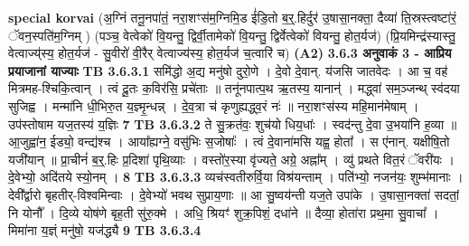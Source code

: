 \documentclass[17pt]{extarticle}
\begin{document}
{{{{{{{{{{{{{{{{{{{                                                        \textbf{special korvai} \newline
              (अ॒ग्निं तनू॒नपा॑तं॒ नरा॒शꣳस॑म॒ग्निमि॒ड ई॑डि॒तो ब॒र्॒.हिर्दुर॑ उ॒षासा॒नक्ता॒ दैव्या॑ ति॒स्रस्त्वष्टा॑रं॒ ॅवन॒स्पति॑म॒ग्निम् ) (पञ्च॒ वेत्वेको॑ वि॒यन्तु॒ द्विर्वी॒तामेको॑ वि॒यन्तु॒ द्विर्वेत्वेको॑ वियन्तु॒ होत॒र्यज॑) \newline
                                (प्रि॒यमिन्द्र॑स्यास्तु॒ वेत्वाज्य्॑स्य॒ होत॒र्यज॑ - सु॒वीरो॑ वी॒रैर् वेत्वाज्य॑स्य॒ होत॒र्यज॑ च॒त्वारि॑ च) \textbf{(A2)} \newline \newline
                \textbf{ 3.6.3     अनुवाकं   3 - आप्रिय प्रयाजानां याज्याः} \newline
                                \textbf{ TB 3.6.3.1} \newline
                  समि॑द्धो अ॒द्य मनु॑षो दुरो॒णे । दे॒वो दे॒वान्. य॑जसि जातवेदः । आ च॒ वह॑ मित्रमह-श्चिकि॒त्वान् । त्वं दू॒तः क॒विर॑सि॒ प्रचे॑ताः ॥ तनू॑नपात्प॒थ ऋ॒तस्य॒ यानान्॑ । मद्ध्वा॑ सम॒ञ्जन्थ् स्व॑दया सुजिह्व । मन्मा॑नि धी॒भिरु॒त य॒ज्ञ्मृ॒न्धन्न् । दे॒व॒त्रा च॑ कृणुह्यद्ध्व॒रं नः॑ ॥ नरा॒शꣳस॑स्य महि॒मान॑मेषाम् । उप॑स्तोषाम यज॒तस्य॑ य॒ज्ञिः \textbf{ 7} \newline
                  \newline
                                \textbf{ TB 3.6.3.2} \newline
                  ते सु॒क्रत॑वः॒ शुच॑यो धिय॒धांः । स्वद॑न्तु दे॒वा उ॒भया॑नि ह॒व्या ॥ आ॒जुह्वा॑न॒ ईड्यो॒ वन्द्य॑श्च । आया᳚ह्यग्ने॒ वसु॑भिः स॒जोषाः᳚ । त्वं दे॒वाना॑मसि यह्व॒ होता᳚ । स ए॑नान्. यक्षीषि॒तो यजी॑यान् ॥ प्रा॒चीनं॑ ब॒र्॒.हिः प्र॒दिशा॑ पृथि॒व्याः । वस्तो॑र॒स्या वृ॑ज्यते॒ अग्रे॒ अह्ना᳚म् । व्यु॑ प्रथते वित॒रं ॅवरी॑यः । दे॒वेभ्यो॒ अदि॑तये स्यो॒नम् । \textbf{ 8} \newline
                  \newline
                                \textbf{ TB 3.6.3.3} \newline
                  व्यच॑स्वतीरुर्वि॒या विश्र॑यन्ताम् । पति॑भ्यो॒ नजन॑यः॒ शुम्भ॑मानाः । देवी᳚र्द्वारो बृहतीर्-विश्वमिन्वाः । दे॒वेभ्यो॑ भवथ सुप्राय॒णाः ॥ आ सु॒ष्वय॑न्ती यज॒ते उपा॑के । उ॒षासा॒नक्ता॑ सदतां॒ नि योनौ᳚ । दि॒व्ये योष॑णे बृह॒ती सु॑रु॒क्मे । अधि॒ श्रियꣳ॑ शुक्र॒पिशं॒ दधा॑ने ॥ दैव्या॒ होता॑रा प्रथ॒मा सु॒वाचा᳚ । मिमा॑ना य॒ज्ञ्ं मनु॑षो॒ यज॑द्ध्यै \textbf{ 9} \newline
                  \newline
                                \textbf{ TB 3.6.3.4} \newline
}}}}}}}}}}}}}}}}}}}
\end{document}
